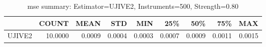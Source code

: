 \begin{table}[ht]
\centering
\caption{mse summary: Estimator=UJIVE2, Instruments=500, Strength=0.80}
\begin{tabular}{lrrrrrrrr}
\toprule
 & COUNT & MEAN & STD & MIN & 25\% & 50\% & 75\% & MAX \\
\midrule
UJIVE2 & 10.0000 & 0.0009 & 0.0004 & 0.0003 & 0.0007 & 0.0009 & 0.0011 & 0.0015 \\
\bottomrule
\end{tabular}
\end{table}
